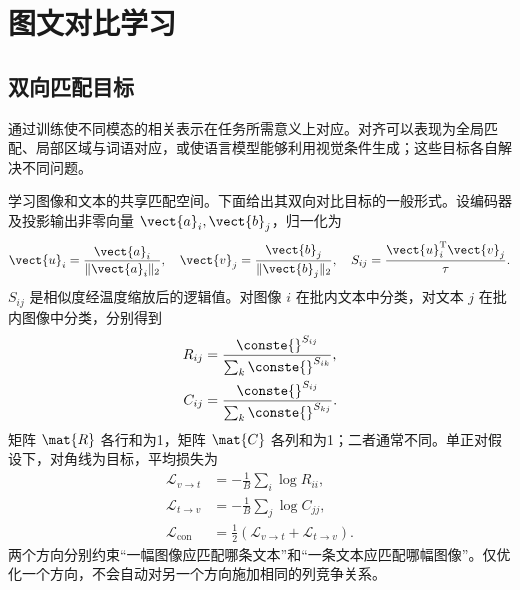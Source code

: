 \documentclass[../textbook.tex]{subfiles}
\begin{document}
\section{图文对比学习}

\subsection{双向匹配目标}
通过训练使不同模态的相关表示在任务所需意义上对应。对齐可以表现为全局匹配、局部区域与词语对应，或使语言模型能够利用视觉条件生成；这些目标各自解决不同问题。

学习图像和文本的共享匹配空间\cite{radford2021clip}。下面给出其双向对比目标的一般形式。设编码器及投影输出非零向量 $\vect{a}_i,\vect{b}_j$，归一化为
\begin{equation}
 \vect{u}_i=\frac{\vect{a}_i}{\|\vect{a}_i\|_2},\quad
 \vect{v}_j=\frac{\vect{b}_j}{\|\vect{b}_j\|_2},\quad
 S_{ij}=\frac{\vect{u}_i^{\mathrm{T}}\vect{v}_j}{\tau}.
\end{equation}
$S_{ij}$ 是相似度经温度缩放后的逻辑值。对图像 $i$ 在批内文本中分类，对文本 $j$ 在批内图像中分类，分别得到
\begin{equation}
 \begin{aligned}
  R_{ij} &= \frac{\conste{}^{S_{ij}}}{\sum_k \conste{}^{S_{ik}}}, \\
  C_{ij} &= \frac{\conste{}^{S_{ij}}}{\sum_k \conste{}^{S_{kj}}}.
 \end{aligned}
\end{equation}
矩阵 $\mat{R}$ 各行和为1，矩阵 $\mat{C}$ 各列和为1；二者通常不同。单正对假设下，对角线为目标，平均损失为
\begin{align}
 \mathcal L_{v\to t}&=-\frac1B\sum_i\log R_{ii},\\
 \mathcal L_{t\to v}&=-\frac1B\sum_j\log C_{jj},\\
 \mathcal L_{\mathrm{con}}&=\frac12(\mathcal L_{v\to t}+\mathcal L_{t\to v}).
 \label{eq:mm-contrastive}
\end{align}
两个方向分别约束“一幅图像应匹配哪条文本”和“一条文本应匹配哪幅图像”。仅优化一个方向，不会自动对另一个方向施加相同的列竞争关系。
\end{document}
